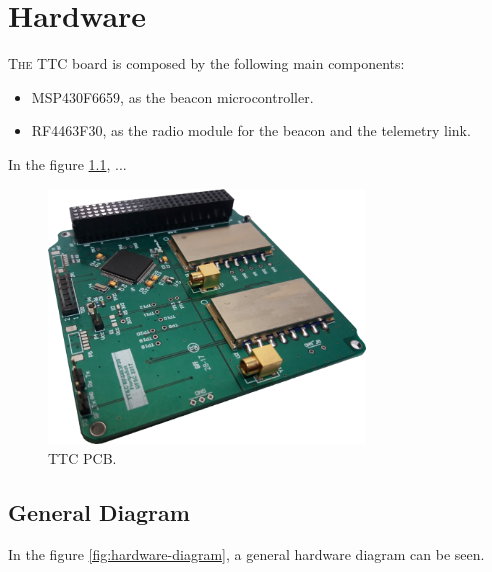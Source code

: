 \documentclass[12pt]{book}
\begin{document}

\chapter{Hardware}

\lettrine{T}{he} TTC board is composed by the following main components:

\begin{itemize}
	\item MSP430F6659, as the beacon microcontroller.
	\item RF4463F30, as the radio module for the beacon and the telemetry link.
\end{itemize}

In the figure \ref{fig:ttc-board}, ...

\begin{figure}[!h]
	\begin{center}
		\includegraphics[width=0.75\textwidth]{figures/ttc_board.png}
		\caption{TTC PCB.}
		\label{fig:ttc-board}
	\end{center}
\end{figure}

\section{General Diagram}

In the figure \ref{fig:hardware-diagram}, a general hardware diagram can be seen.
\end{document}
